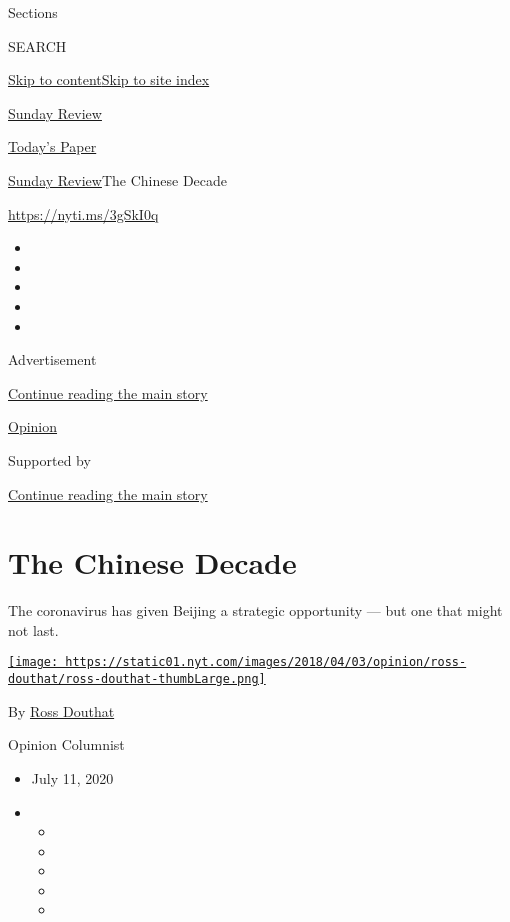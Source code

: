 Sections

SEARCH

\protect\hyperlink{site-content}{Skip to
content}\protect\hyperlink{site-index}{Skip to site index}

\href{https://www.nytimes.com/section/opinion/sunday}{Sunday Review}

\href{https://myaccount.nytimes.com/auth/login?response_type=cookie\&client_id=vi}{}

\href{https://www.nytimes.com/section/todayspaper}{Today's Paper}

\href{/section/opinion/sunday}{Sunday Review}\textbar{}The Chinese
Decade

\href{https://nyti.ms/3gSkI0q}{https://nyti.ms/3gSkI0q}

\begin{itemize}
\item
\item
\item
\item
\item
\end{itemize}

Advertisement

\protect\hyperlink{after-top}{Continue reading the main story}

\href{/section/opinion}{Opinion}

Supported by

\protect\hyperlink{after-sponsor}{Continue reading the main story}

\hypertarget{the-chinese-decade}{%
\section{The Chinese Decade}\label{the-chinese-decade}}

The coronavirus has given Beijing a strategic opportunity --- but one
that might not last.

\href{https://www.nytimes.com/by/ross-douthat}{\texttt{[image: https://static01.nyt.com/images/2018/04/03/opinion/ross-douthat/ross-douthat-thumbLarge.png]}}

By \href{https://www.nytimes.com/by/ross-douthat}{Ross Douthat}

Opinion Columnist

\begin{itemize}
\item
  July 11, 2020
\item
  \begin{itemize}
  \item
  \item
  \item
  \item
  \item
  \end{itemize}
\end{itemize}

